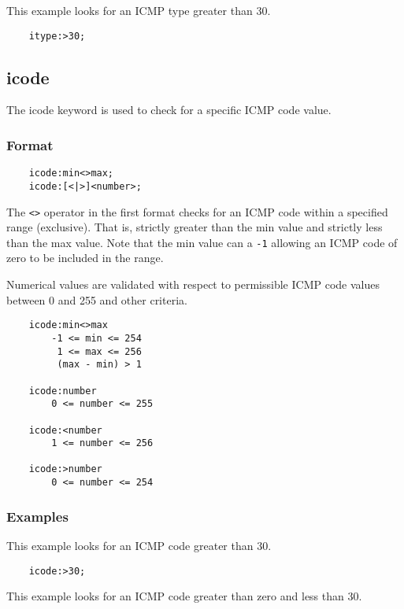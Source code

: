 \documentclass[english]{report}
\begin{document}
This example looks for an ICMP type greater than 30.

\begin{verbatim}
    itype:>30;
\end{verbatim}

\subsection{icode}

The icode keyword is used to check for a specific ICMP code value.

\subsubsection{Format}

\begin{verbatim}
    icode:min<>max;
    icode:[<|>]<number>;
\end{verbatim}

The \texttt{<>} operator in the first format checks for an ICMP code within a specified range (exclusive).  That is, strictly greater than the min value and strictly less than the max value.  Note that the min value can a \texttt{-1} allowing an ICMP code of zero to be included in the range.

Numerical values are validated with respect to permissible ICMP code values between 0 and 255 and other criteria. 

\begin{verbatim}
    icode:min<>max
        -1 <= min <= 254
         1 <= max <= 256
         (max - min) > 1

    icode:number
        0 <= number <= 255

    icode:<number
        1 <= number <= 256

    icode:>number
        0 <= number <= 254
\end{verbatim}

\subsubsection{Examples}

This example looks for an ICMP code greater than 30.

\begin{verbatim}
    icode:>30;
\end{verbatim}

This example looks for an ICMP code greater than zero and less than 30.
\end{document}
